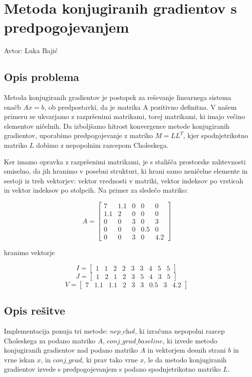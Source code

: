 \documentclass[12pt,a4paper]{article}
\begin{document}
\section{Metoda konjugiranih gradientov s predpogojevanjem}
Avtor: Luka Bajić


\subsection{Opis problema}
Metoda konjugiranih gradientov je postopek za reševanje linearnega sistema enačb $Ax = b$, ob predpostavki, da je matrika A pozitivno definitna. V našem primeru se ukvarjamo z razpršenimi matrikami, torej matrikami, ki imajo večino elementov ničelnih. Da izboljšamo hitrost konvergence metode konjugiranih gradientov, uporabimo predpogojevanje z matriko $M=LL^T$, kjer spodnjetrikotno matriko $L$ dobimo z nepopolnim razcepom Choleskega. 


Ker imamo opravka z razpršenimi matrikami, je s stališča prostorske zahtevnosti smiselno, da jih hranimo v posebni strukturi, ki hrani samo neničelne elemente in sestoji iz treh vektorjev: vektor  vrednosti v matriki, vektor indeksov po vrsticah in vektor indeksov po stolpcih. Na primer za sledečo matriko:


\[
A=\begin{bmatrix}7 & 1.1 & 0 & 0 & 0 \\ 1.1 & 2 & 0 & 0 & 0 \\ 0 & 0 & 3 & 0 & 3 \\ 0 & 0 & 0 & 0.5 & 0 \\ 0 & 0 & 3 & 0 & 4.2 \end{bmatrix}
\]

hranimo vektorje


\[
I = \begin{bmatrix}1 & 1 & 2 & 2 & 3 & 3 & 4 & 5 & 5 \end{bmatrix}
\]
\[
J = \begin{bmatrix}1 & 2 & 1 & 2 & 3 & 5 & 4 & 3 & 5 \end{bmatrix}
\]
\[
V = \begin{bmatrix}7 & 1.1 & 1.1 & 2 & 3 & 3 & 0.5 & 3 & 4.2 \end{bmatrix}
\]

\subsection{Opis rešitve}
Implementacija ponuja tri metode: $\textit{nep\_chol}$, ki izračuna nepopolni razcep Choleskega za podano matriko $A$, $\textit{conj\_grad\_baseline}$, ki izvede metodo konjugiranih gradientov nad podano matriko $A$ in vektorjem desnih strani $b$ in vrne iskan $x$, in $\textit{conj\_grad}$,  ki prav tako vrne $x$, le da metodo konjugiranih gradientov izvede s predpogojevanjem s podano  spodnjetrikotno matriko $L$.
\end{document}
